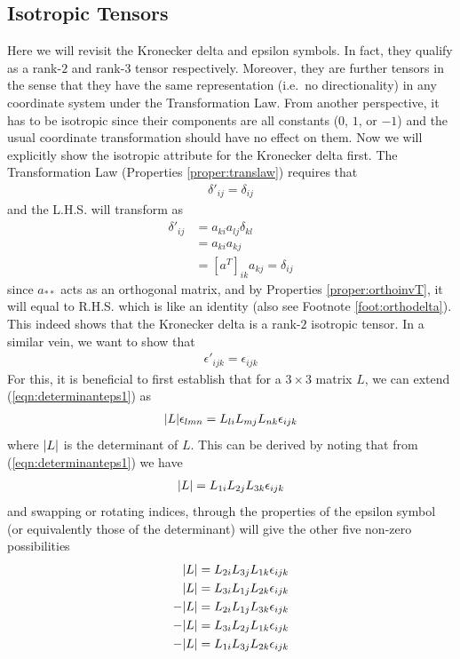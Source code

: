 \subsection{Isotropic Tensors}

Here we will revisit the Kronecker delta and epsilon symbols. In fact, they qualify as a rank-$2$ and rank-$3$ tensor respectively. Moreover, they are further  tensors in the sense that they have the same representation (i.e.\ no directionality) in any coordinate system under the Transformation Law. From another perspective, it has to be isotropic since their components are all constants ($0$, $1$, or $-1$) and the usual coordinate transformation should have no effect on them. Now we will explicitly show the isotropic attribute for the Kronecker delta first. The Transformation Law (Properties \ref{proper:translaw}) requires that
\begin{align}
\delta'_{ij} = \delta_{ij}
\end{align}
and the L.H.S. will transform as
\begin{align*}
\delta'_{ij} &= a_{ki}a_{lj}\delta_{kl} \\
&= a_{ki}a_{kj} \\
&= [a^T]_{ik}a_{kj} = \delta_{ij}
\end{align*}
since $a_{**}$ acts as an orthogonal matrix, and by Properties \ref{proper:orthoinvT}, it will equal to R.H.S. which is like an identity (also see Footnote \ref{foot:orthodelta}). This indeed shows that the Kronecker delta is a rank-$2$ isotropic tensor. In a similar vein, we want to show that
\begin{align}
\epsilon'_{ijk} = \epsilon_{ijk}
\end{align}
For this, it is beneficial to first establish that for a $3 \times 3$ matrix $L$, we can extend (\ref{eqn:determinanteps1}) as
\begin{align}
\abs{L}\epsilon_{lmn} = L_{li}L_{mj}L_{nk}\epsilon_{ijk} \label{eqn:determinanteps2}
\end{align}
where $\abs{L}$ is the determinant of $L$. This can be derived by noting that from (\ref{eqn:determinanteps1}) we have
\begin{align}
\abs{L} = L_{1i}L_{2j}L_{3k}\epsilon_{ijk} \label{eqn:determinanteps3}
\end{align}
and swapping or rotating indices, through the properties of the epsilon symbol (or equivalently those of the determinant) will give the other five non-zero possibilities
\begin{align*}
\abs{L} &= L_{2i}L_{3j}L_{1k}\epsilon_{ijk} \\
\abs{L} &= L_{3i}L_{1j}L_{2k}\epsilon_{ijk} \\
-\abs{L} &= L_{2i}L_{1j}L_{3k}\epsilon_{ijk} \\
-\abs{L} &= L_{3i}L_{2j}L_{1k}\epsilon_{ijk} \\
-\abs{L} &= L_{1i}L_{3j}L_{2k}\epsilon_{ijk}
\end{align*}
